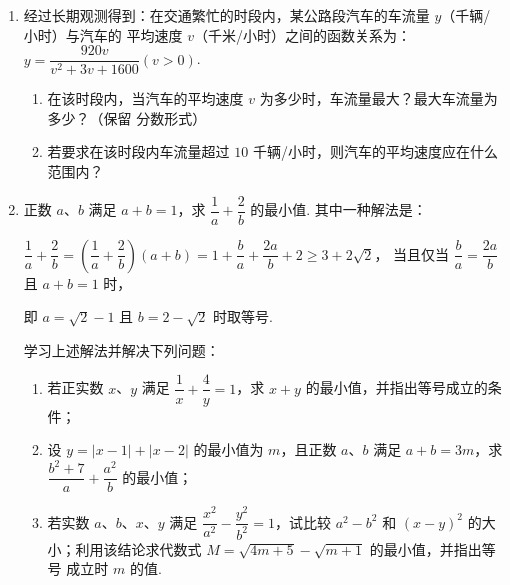 \documentclass[a4paper,11pt]{article}
\begin{document}
\begin{enumerate}
\fi

\ansspace[6]

\item 经过长期观测得到：在交通繁忙的时段内，某公路段汽车的车流量 $y$（千辆/小时）与汽车的
平均速度 $v$（千米/小时）之间的函数关系为：$y=\dfrac{920v}{v^2+3v+1600}(v>0)$.

\begin{enumerate}[label=(\arabic*)]
\item 在该时段内，当汽车的平均速度 $v$ 为多少时，车流量最大？最大车流量为多少？（保留
分数形式）
\item 若要求在该时段内车流量超过 $10$ 千辆/小时，则汽车的平均速度应在什么范围内？
\end{enumerate}

\ifanswer
\solbegin
{}
\solend

\fi

\ansspace[6]

\item 正数 $a$、$b$ 满足 $a+b=1$，求 $\dfrac1a+\dfrac2b$ 的最小值. 其中一种解法是：

$\dfrac1a+\dfrac2b=\left(\dfrac1a+\dfrac2b\right)(a+b)=1+\dfrac ba+\dfrac{2a}b+2\geqslant3+2\sqrt2$，
当且仅当 $\dfrac ba=\dfrac{2a}b$ 且 $a+b=1$ 时，

即 $a=\sqrt2-1$ 且 $b=2-\sqrt2$ 时取等号.

学习上述解法并解决下列问题：

\begin{enumerate}[label=(\arabic*)]
\item 若正实数 $x$、$y$ 满足 $\dfrac1x+\dfrac4y=1$，求 $x+y$ 的最小值，并指出等号成立的条件；
\item 设 $y=|x-1|+|x-2|$ 的最小值为 $m$，且正数 $a$、$b$ 满足 $a+b=3m$，求
$\dfrac{b^2+7}{a}+\dfrac{a^2}{b}$ 的最小值；
\item 若实数 $a$、$b$、$x$、$y$ 满足 $\dfrac{x^2}{a^2}-\dfrac{y^2}{b^2}=1$，试比较 $a^2-b^2$ 和
$(x-y)^2$ 的大小；利用该结论求代数式 $M=\sqrt{4m+5}-\sqrt{m+1}$ 的最小值，并指出等号
成立时 $m$ 的值.
\end{enumerate}


\end{enumerate}
\end{document}
